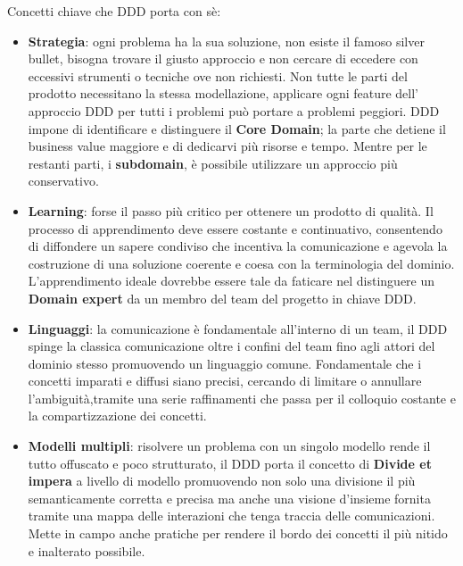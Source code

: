     
    
    Concetti chiave che DDD porta con sè:
    
        \begin{itemize}
        \item \textbf{Strategia}: ogni problema ha la sua soluzione, non esiste il famoso silver bullet, bisogna trovare il giusto approccio e non cercare di eccedere con eccessivi strumenti o tecniche ove non richiesti.
        Non tutte le parti del prodotto necessitano la stessa modellazione, applicare ogni feature dell' approccio DDD per tutti i problemi può portare a problemi peggiori.
        DDD impone di identificare e distinguere il \textbf{Core Domain}; la parte che detiene il business value maggiore e di dedicarvi più risorse e tempo.
        Mentre per le restanti parti, i \textbf{subdomain}, è possibile utilizzare un approccio più conservativo.
        
        \item \textbf{Learning}: forse il passo più critico per ottenere un prodotto di qualità. Il processo di apprendimento deve essere costante e continuativo, consentendo di diffondere un sapere condiviso che incentiva la comunicazione e agevola la costruzione di una soluzione coerente e coesa con la terminologia del dominio. 
        L'apprendimento ideale dovrebbe essere tale da faticare nel distinguere un \textbf{Domain expert} da un membro del team del progetto in chiave DDD.
        
        \item \textbf{Linguaggi}: la comunicazione è fondamentale all'interno di un team, il DDD spinge la classica comunicazione oltre i confini del team fino agli attori del dominio stesso promuovendo un linguaggio comune.
        Fondamentale che i concetti imparati e diffusi siano precisi, cercando di limitare o annullare l'ambiguità,tramite una serie raffinamenti che passa per il colloquio costante e la compartizzazione dei concetti.
        
        \item \textbf{Modelli multipli}: risolvere un problema con un singolo modello rende il tutto offuscato e poco strutturato, il DDD porta il concetto di \textbf{Divide et impera} a livello di modello promuovendo non solo una divisione il più semanticamente corretta e precisa ma anche una visione d'insieme fornita tramite una mappa delle interazioni che tenga traccia delle comunicazioni.
        Mette in campo anche pratiche per rendere il bordo dei concetti il più nitido e inalterato possibile.
        

\end{itemize}
